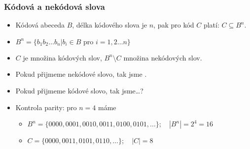 \documentclass{beamer}
\newenvironment{itemizex}%
  {\large \begin{itemize}%
    \setlength{\itemsep}{8pt}%
    \setlength{\parskip}{8pt}}%
  {\end{itemize}}
\newenvironment{itemizey}%
  {\large \begin{itemize}%
    \setlength{\itemsep}{6pt}%
    \setlength{\parskip}{6pt}}%
  {\end{itemize}}
\begin{document}
\begin{frame}[t,fragile]\frametitle{Kódová a nekódová slova} 
    \begin{itemizey}
        \item Kódová abeceda $B$, délka kódového slova je $n$, pak pro kód $C$ platí: $C\subseteq B^n$.
        \item $B^n=\{b_1b_2\dots b_n|b_i\in B \mbox{ pro } i = 1,2\dots n\}$
        \item $C$ je množina kódových slov, $B^n\setminus C$ množina nekódových slov.
        \item Pokud přijmeme nekódové slovo, tak jsme .
        \item Pokud přijmeme kódové slovo, tak jsme\dots?
        \item Kontrola parity: pro $n=4$ máme 
            \begin{itemize}
                \item $B^n=\{0000, 0001, 0010, 0011, 0100, 0101, \dots\}; \quad |B^n|=2^4=16$
                \item $C=\{0000, 0011, 0101, 0110, \dots\}; \quad |C|=8$
            \end{itemize}
    \end{itemizey}
\end{frame}


\end{document}

